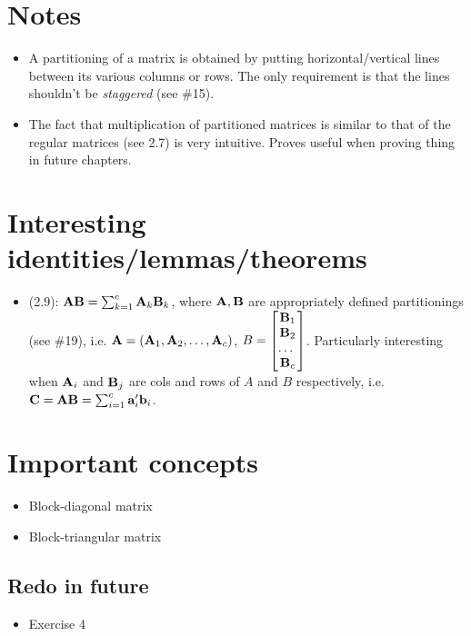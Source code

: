 \documentclass[a4paper, oneside]{book}
\begin{document}
\section*{Notes}
\begin{itemize}
\item A partitioning of a matrix is obtained by putting horizontal/vertical lines between its various columns or rows. The only requirement is that the lines shouldn't be \textit{staggered} (see \#15). 
\item The fact that multiplication of partitioned matrices is similar to that of the regular matrices (see 2.7) is very intuitive. Proves useful when proving thing in future chapters.
\end{itemize}

\section*{Interesting identities/lemmas/theorems}

\begin{itemize}
\item (2.9): $\mathbf{AB} = \sum_{k=1}^c \mathbf{A}_k \mathbf{B}_k$, where $\mathbf{A,B}$ are appropriately defined partitionings (see \#19), i.e. $\mathbf{A} = \left(\mathbf{A}_1, \mathbf{A}_2, \hdots, \mathbf{A}_c \right)$, $B=\begin{bmatrix} \mathbf{B}_1\\ \mathbf{B}_2\\ \hdots\ \\ \mathbf{B}_c \end{bmatrix}$. Particularly interesting when $\mathbf{A}_i$ and $\mathbf{B}_j$ are cols and rows of $A$ and $B$ respectively, i.e. $\mathbf{C}=\mathbf{A}\mathbf{B}=\sum_{i=1}^c \mathbf{a}'_i\mathbf{b}_i$.
\end{itemize}

\section*{Important concepts}
\begin{itemize}
\item Block-diagonal matrix
\item Block-triangular matrix
\end{itemize}

\subsection{Redo in future}
\begin{itemize}
\item Exercise 4
\end{itemize}
\end{document}
